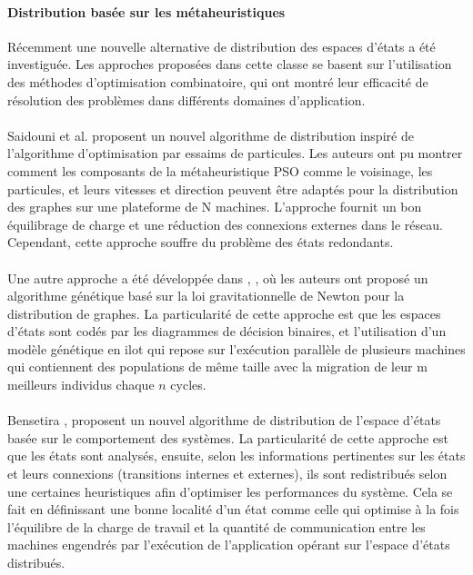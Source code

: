  \paragraph{Distribution basée sur les métaheuristiques}
Récemment une nouvelle alternative de distribution des espaces d'états a été investiguée. Les approches proposées dans cette classe se basent sur l'utilisation des méthodes d'optimisation combinatoire, qui ont montré leur efficacité de résolution des problèmes dans différents domaines d'application.
 \\\\ 
Saidouni et al. \citep{Saidouni2012} proposent un nouvel algorithme de distribution inspiré de l'algorithme d'optimisation par essaims de particules. Les auteurs ont pu montrer comment les composants de la métaheuristique PSO comme le voisinage, les particules, et leurs vitesses et direction peuvent être adaptés pour la distribution des graphes sur une plateforme de N machines. L'approche fournit un bon équilibrage de charge et une réduction des connexions externes dans le réseau. Cependant, cette approche souffre du problème des états redondants.
\\\\
Une autre approche a été développée dans  \citep{TabibSaidouni2016},  \citep{Tabib2017}, où les auteurs ont proposé un algorithme génétique basé sur la loi gravitationnelle de Newton pour la distribution de graphes. La particularité de cette approche est que les espaces d'états sont codés par les diagrammes de décision binaires, et l'utilisation d'un modèle génétique en ilot qui repose sur l'exécution parallèle de plusieurs machines qui contiennent des populations de même taille avec la migration de leur m meilleurs individus chaque $n$ cycles.
\\\\
Bensetira \citep{BENSETIRA2017}, proposent un nouvel algorithme de distribution de l'espace d'états basée sur le comportement des systèmes. La particularité de cette approche est que les états sont analysés, ensuite, selon les informations pertinentes sur les états et leurs connexions (transitions internes et externes), ils sont redistribués selon une certaines heuristiques afin d'optimiser les performances du système. Cela se fait en définissant une bonne localité d'un état comme celle qui optimise à la fois l'équilibre de la charge de travail et la quantité de communication entre les machines engendrés par l'exécution de l'application opérant sur l'espace d'états distribués.